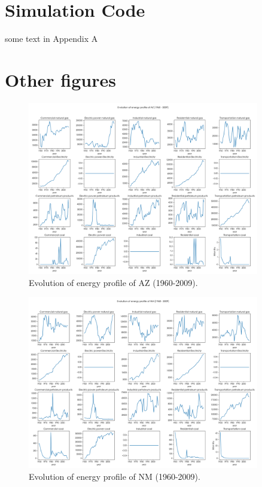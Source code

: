 \documentclass[a4paper,11pt]{article}
\begin{document}
\newpage%
\begin{appendices}  
    \section*{Simulation Code}  
    some text in Appendix A  
    \section*{Other figures}

\begin{figure}[h]%
    \centering 
    \includegraphics[width=0.9\textwidth]{./Pic/part-2-AZ.png}
    \caption{Evolution of energy profile of AZ (1960-2009).}
    \label{fig:part-2-AZ}  
\end{figure}

\begin{figure}[h]%
    \centering 
    \includegraphics[width=0.9\textwidth]{./Pic/part-2-NM.png}
    \caption{Evolution of energy profile of NM (1960-2009).}
    \label{fig:part-2-NM}  
\end{figure}


\end{appendices}
\end{document}
